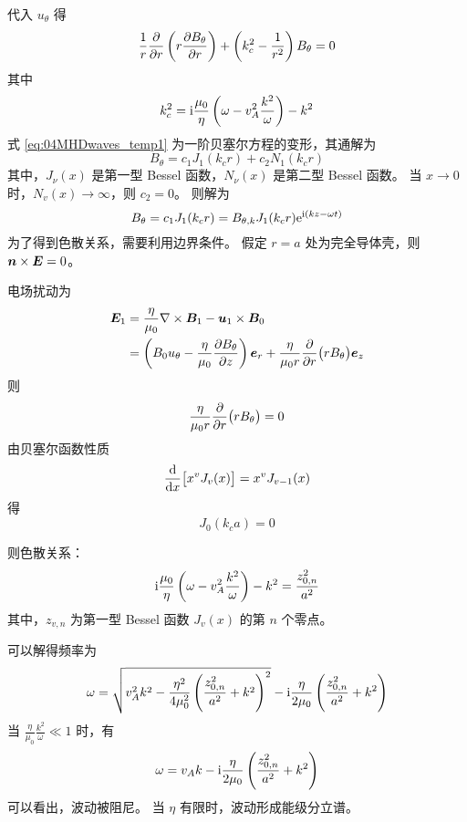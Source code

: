 代入 $u_\theta$ 得
\begin{equation} \label{eq:04MHDwaves_temp1}
\frac{1}{r} \frac{\partial {}}{\partial {r}} \left( r \frac{\partial {B_\theta}}{\partial {r}} \right)
+ \left( k_c^2 - \frac{1}{r^2} \right) B_\theta = 0
\end{equation}
其中
\begin{equation}
k_c^2 = \mathrm{i} \frac{\mu_0}{\eta} \left( \omega - v_A^2 \frac{k^2}{\omega} \right) - k^2
\end{equation}
式 \ref{eq:04MHDwaves_temp1} 为一阶贝塞尔方程的变形，其通解为
\begin{equation}
B_\theta = c_1 J_1(k_c r) + c_2 N_1(k_c r)
\end{equation}
其中，$J_\nu(x)$ 是第一型 Bessel 函数，$N_\nu(x)$ 是第二型 Bessel 函数。
当 $x \to 0$ 时，$N_v(x) \to \infty$，则 $c_2 = 0$。
则解为
\begin{equation}
B_\theta = c_1 J_1(k_c r)
= B_{\theta,k} J_1(k_c r)
\mathrm{e}^{\mathrm{i}(k z - \omega t)}
\end{equation}
为了得到色散关系，需要利用边界条件。
假定 $r = a$ 处为完全导体壳，则 $\bm{n} \times \bm{E} = 0$。

电场扰动为
\begin{equation}\begin{aligned}
\bm{E}_1 &= \frac{\eta}{\mu_0} \nabla \times {\bm{B}_1}
- \bm{u}_1 \times \bm{B}_0 \\
&= \left( B_0 u_\theta - \frac{\eta}{\mu_0} \frac{\partial {B_\theta}}{\partial {z}} \right) \bm{e}_r
+ \frac{\eta}{\mu_0 r} \frac{\partial {}}{\partial {r}} \big( r B_\theta \big) \bm{e}_z
\end{aligned}\end{equation}
则
\begin{equation}
\frac{\eta}{\mu_0 r} \frac{\partial {}}{\partial {r}} \big( r B_\theta \big) = 0
\end{equation}
由贝塞尔函数性质
\begin{equation}
\frac{\mathop{}\!\mathrm{d} {}}{\mathop{}\!\mathrm{d} {x}} \big[ x^v J_v(x) \big] = x^v J_{v-1}(x)
\end{equation}
得
\begin{equation}
J_0(k_c a) = 0
\end{equation}

则色散关系：
\begin{equation}
\mathrm{i} \frac{\mu_0}{\eta} \left( \omega - v_A^2 \frac{k^2}{\omega} \right) - k^2 = \frac{z_{0,n}^2}{a^2}
\end{equation}
其中，$z_{v,n}$ 为第一型 Bessel 函数 $J_v(x)$ 的第 $n$ 个零点。

可以解得频率为
\begin{equation}
\omega = \sqrt{
    v_A^2 k^2
    - \frac{\eta^2}{4 \mu_0^2} \left( \frac{z_{0,n}^2}{a^2} + k^2 \right)^2
} - \mathrm{i} \frac{\eta}{2 \mu_0} \left( \frac{z_{0,n}^2}{a^2} + k^2 \right)
\end{equation}
当 $\frac{\eta}{\mu_0} \frac{k^2}{\omega} \ll 1$ 时，有
\begin{equation}
\omega = v_A k - \mathrm{i} \frac{\eta}{2 \mu_0} \left( \frac{z_{0,n}^2}{a^2} + k^2 \right)
\end{equation}
可以看出，波动被阻尼。
当 $\eta$ 有限时，波动形成能级分立谱。

